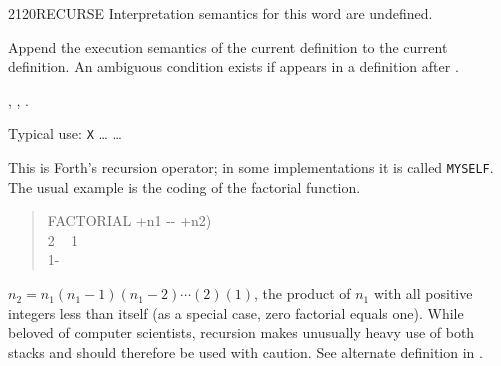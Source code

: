 \begin{worddef}{2120}{RECURSE}
\interpret
	Interpretation semantics for this word are undefined.

\compile
	\stack{}{}

	Append the execution semantics of the current definition to
	the current definition. An ambiguous condition exists if
	 appears in a definition after .

\see {},
	,
	.

	\begin{rationale} %
		Typical use:
			\word{:} \texttt{X} {\ldots}  {\ldots} \word{;}

		This is Forth's recursion operator; in some implementations it
		is called \texttt{MYSELF}. The usual example is the coding of
		the factorial function.

		\begin{quote}\ttfamily
		\word{:} FACTORIAL  +n1 -{}- +n2) \\
		\tab {} 2  ~
				 1 ~
			 \\
		\tab {} 1- ~~ \word{*} \\
		\word{;}
		\end{quote}

		$n_2 = n_1(n_1-1)(n_1-2)\cdots(2)(1)$, the product of $n_1$
		with all positive integers less than itself (as a special case,
		zero factorial equals one). While beloved of computer scientists,
		recursion makes unusually heavy use of both stacks and should
		therefore be used with caution. See alternate definition in
		.
	\end{rationale}

	\begin{testing} %
		 \\
		 \\
		 \\
		 \\
		 \\

		 \\	
		 \\
		 \\


\end{testing}
\end{worddef}
